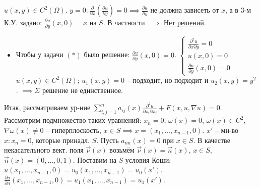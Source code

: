 \documentclass[12pt, a4paper]{article}
\begin{document}
$u(x,y) \in C^2(\Omega)$. $y=0: \frac{\partial}{\partial x} \left( \frac{\partial u}{\partial y} \right) = 0 \implies \frac{\partial u}{\partial y}$ не должна зависеть от $x$, а в 3-м К.У. задано: $\frac{\partial u}{\partial y}(x,0)=x$ на $S$. В частности $\implies$ \underline{Нет решений}.
\begin{itemize}
    \item Чтобы у задачи $(*)$ было решение: $\frac{\partial u}{\partial y}(x,0)=0$.
    $\begin{cases} \frac{\partial^2 u}{\partial x \partial y} = 0 \\ u(x,0)=0 \\ \frac{\partial u}{\partial y}(x,0)=0 \end{cases}$
    $u(x,y) \in C^2(\Omega)$; $u_1(x,y)=0$ -- подходит, но подходит и $u_2(x,y)=y^2$.
    $\implies \Sigma$ решение не единственное.
\end{itemize}

Итак, рассматриваем ур-ние $\sum_{i,j=1}^n a_{ij}(x) \frac{\partial^2 u}{\partial x_i \partial x_j} + F(x,u,\nabla u) = 0$.
Рассмотрим подмножество таких уравнений: $x_n=0$, $\omega(x)=0$, $\omega(x) \in C^2$, $\nabla \omega(x) \ne 0$ -- гиперплоскость, $x \in S \implies x=(x_1, \dots, x_{n-1},0)$.
$x'$ -- мн-во $x: x_n=0$, которые принадл. $S$.
Пусть $a_{nn}(x)=0$ при $x \in S$. В качестве некасательного вект. поля $\vec{\nu}(x)$ возьмём $\vec{\nu}(x) = \vec{n}(x)$, $x \in S$, $\vec{n}(x)=(0, \dots, 0,1)$.
Поставим на $S$ условия Коши:
$u(x_1, \dots, x_{n-1},0) = u_0(x_1, \dots, x_{n-1}) = u_0(x')$.
$\frac{\partial u}{\partial n}(x_1, \dots, x_{n-1},0) = u_1(x_1, \dots, x_{n-1}) = u_1(x')$.
\end{document}
